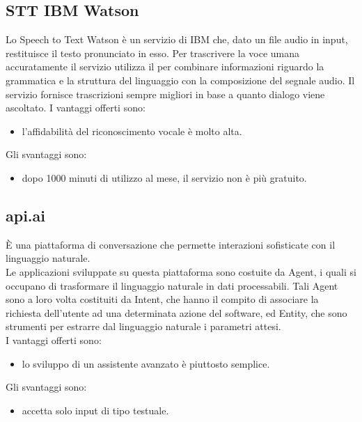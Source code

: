 \subsection{STT IBM Watson}
Lo Speech to Text Watson è un servizio di IBM che, dato un file audio in input, restituisce il testo pronunciato in esso. Per trascrivere la voce umana accuratamente il servizio utilizza il  per combinare informazioni riguardo la grammatica e la struttura del linguaggio con la composizione del segnale audio. Il servizio fornisce trascrizioni sempre migliori in base a quanto dialogo viene ascoltato.
I vantaggi offerti sono:
\begin{itemize}
	\item l'affidabilità del riconoscimento vocale è molto alta.
\end{itemize}
Gli svantaggi sono:
\begin{itemize}
	\item dopo 1000 minuti di utilizzo  al mese, il servizio non è più gratuito.
\end{itemize}
\subsection{api.ai}
È una piattaforma di conversazione che permette interazioni sofisticate con il linguaggio naturale.\\
Le applicazioni sviluppate su questa piattaforma sono costuite da Agent, i quali si occupano di trasformare il linguaggio naturale in dati processabili. Tali Agent sono a loro volta costituiti da Intent, che hanno il compito di associare la richiesta dell'utente ad una determinata azione del software, ed Entity, che sono strumenti per estrarre dal linguaggio naturale i parametri attesi.\\
I vantaggi offerti sono:
\begin{itemize}
	\item lo sviluppo di un assistente avanzato è piuttosto semplice.
\end{itemize}
Gli svantaggi sono:
\begin{itemize}
	\item accetta solo input di tipo testuale.
\end{itemize}
